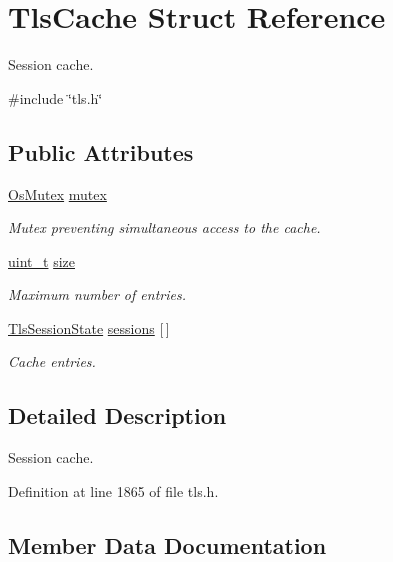 \hypertarget{structTlsCache}{}\section{Tls\+Cache Struct Reference}
\label{structTlsCache}


Session cache.  




{\ttfamily \#include \char`\"{}tls.\+h\char`\"{}}

\subsection*{Public Attributes}
\begin{DoxyCompactItemize}
\item 
\hyperlink{structOsMutex}{Os\+Mutex} \hyperlink{structTlsCache_a82f21fcb2f5eb7103c02a6a447082476}{mutex}
\begin{DoxyCompactList}\small\item\em Mutex preventing simultaneous access to the cache. \end{DoxyCompactList}\item 
\hyperlink{compiler__port_8h_a12a1e9b3ce141648783a82445d02b58d}{uint\+\_\+t} \hyperlink{structTlsCache_a796ebf2823471af019a1c6a16bb2a505}{size}
\begin{DoxyCompactList}\small\item\em Maximum number of entries. \end{DoxyCompactList}\item 
\hyperlink{structTlsSessionState}{Tls\+Session\+State} \hyperlink{structTlsCache_adc79fbdfd19c6c9a1fbcf14e23404df5}{sessions} \mbox{[}$\,$\mbox{]}
\begin{DoxyCompactList}\small\item\em Cache entries. \end{DoxyCompactList}\end{DoxyCompactItemize}


\subsection{Detailed Description}
Session cache. 

Definition at line 1865 of file tls.\+h.



\subsection{Member Data Documentation}
\mbox{\label{structTlsCache_a82f21fcb2f5eb7103c02a6a447082476}} 
